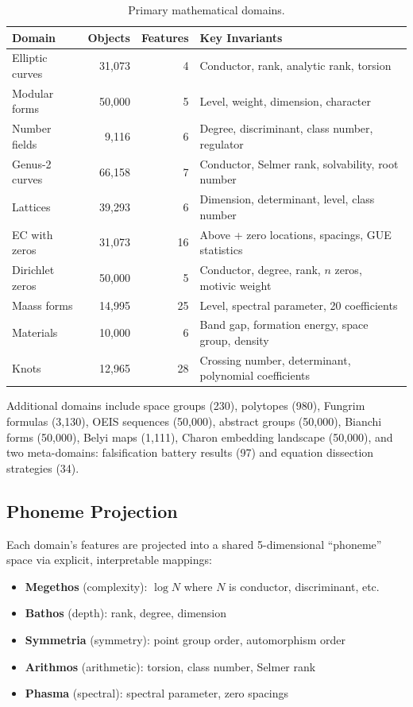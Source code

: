 \documentclass[11pt,a4paper]{article}
\begin{document}
\begin{table}[h]
\centering
\caption{Primary mathematical domains.}
\label{tab:domains}
\begin{tabular}{lrrp{5cm}}
\toprule
Domain & Objects & Features & Key Invariants \\
\midrule
Elliptic curves & 31,073 & 4 & Conductor, rank, analytic rank, torsion \\
Modular forms & 50,000 & 5 & Level, weight, dimension, character \\
Number fields & 9,116 & 6 & Degree, discriminant, class number, regulator \\
Genus-2 curves & 66,158 & 7 & Conductor, Selmer rank, solvability, root number \\
Lattices & 39,293 & 6 & Dimension, determinant, level, class number \\
EC with zeros & 31,073 & 16 & Above + zero locations, spacings, GUE statistics \\
Dirichlet zeros & 50,000 & 5 & Conductor, degree, rank, $n$ zeros, motivic weight \\
Maass forms & 14,995 & 25 & Level, spectral parameter, 20 coefficients \\
Materials & 10,000 & 6 & Band gap, formation energy, space group, density \\
Knots & 12,965 & 28 & Crossing number, determinant, polynomial coefficients \\
\bottomrule
\end{tabular}
\end{table}

Additional domains include space groups (230), polytopes (980), Fungrim formulas (3,130), OEIS sequences (50,000), abstract groups (50,000), Bianchi forms (50,000), Belyi maps (1,111), Charon embedding landscape (50,000), and two meta-domains: falsification battery results (97) and equation dissection strategies (34).

\subsection{Phoneme Projection}

Each domain's features are projected into a shared 5-dimensional ``phoneme'' space via explicit, interpretable mappings:
\begin{itemize}[nosep]
    \item \textbf{Megethos} (complexity): $\log N$ where $N$ is conductor, discriminant, etc.
    \item \textbf{Bathos} (depth): rank, degree, dimension
    \item \textbf{Symmetria} (symmetry): point group order, automorphism order
    \item \textbf{Arithmos} (arithmetic): torsion, class number, Selmer rank
    \item \textbf{Phasma} (spectral): spectral parameter, zero spacings
\end{itemize}
\end{document}
